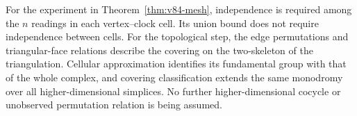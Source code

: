 For the experiment in Theorem~\ref{thm:v84-mesh}, independence is
required among the $n$ readings in each vertex--clock cell. Its union
bound does not require independence between cells. For the topological
step, the edge permutations and triangular-face relations describe
the covering on the two-skeleton of the triangulation. Cellular
approximation identifies its fundamental group with that of the whole
complex, and covering classification extends the same monodromy over
all higher-dimensional simplices. No further higher-dimensional
cocycle or unobserved permutation relation is being assumed.
